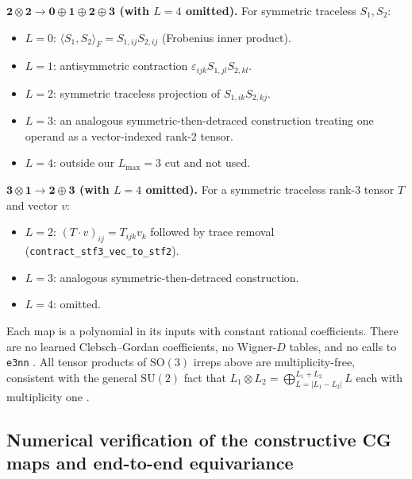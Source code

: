 \textbf{$\mathbf{2} \otimes \mathbf{2} \to \mathbf{0} \oplus \mathbf{1} \oplus \mathbf{2} \oplus \mathbf{3}$ (with $L{=}4$ omitted).}
For symmetric traceless $S_1, S_2$:
\begin{itemize}
    \item $L{=}0$: $\langle S_1, S_2 \rangle_F = S_{1,ij}S_{2,ij}$ (Frobenius inner product).
    \item $L{=}1$: antisymmetric contraction $\varepsilon_{ijk}S_{1,jl}S_{2,kl}$.
    \item $L{=}2$: symmetric traceless projection of $S_{1,ik}S_{2,kj}$.
    \item $L{=}3$: an analogous symmetric-then-detraced construction treating one operand as a vector-indexed rank-2 tensor.
    \item $L{=}4$: outside our $L_{\max}{=}3$ cut and not used.
\end{itemize}

\textbf{$\mathbf{3} \otimes \mathbf{1} \to \mathbf{2} \oplus \mathbf{3}$ (with $L{=}4$ omitted).}
For a symmetric traceless rank-3 tensor $T$ and vector $v$:
\begin{itemize}
    \item $L{=}2$: $(T \cdot v)_{ij} = T_{ijk}v_k$ followed by trace removal (\texttt{contract\_stf3\_vec\_to\_stf2}).
    \item $L{=}3$: analogous symmetric-then-detraced construction.
    \item $L{=}4$: omitted.
\end{itemize}

Each map is a polynomial in its inputs with constant rational coefficients. There are no learned Clebsch--Gordan coefficients, no Wigner-$D$ tables, and no calls to \texttt{e3nn} \citep{geiger2022e3nn}. All tensor products of $\mathrm{SO}(3)$ irreps above are multiplicity-free, consistent with the general $\mathrm{SU}(2)$ fact that $L_1 \otimes L_2 = \bigoplus_{L=|L_1-L_2|}^{L_1+L_2} L$ each with multiplicity one \citep{varshalovich1988quantum}.

\subsection{Numerical verification of the constructive CG maps and end-to-end equivariance}\label{supp:cg_test}

